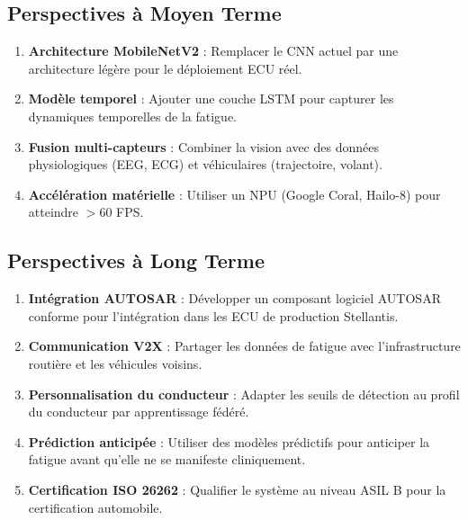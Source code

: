 \subsection{Perspectives à Moyen Terme}

\begin{enumerate}[leftmargin=2cm]
    \item \textbf{Architecture MobileNetV2} : Remplacer le CNN actuel par une architecture légère pour le déploiement ECU réel.
    \item \textbf{Modèle temporel} : Ajouter une couche LSTM pour capturer les dynamiques temporelles de la fatigue.
    \item \textbf{Fusion multi-capteurs} : Combiner la vision avec des données physiologiques (EEG, ECG) et véhiculaires (trajectoire, volant).
    \item \textbf{Accélération matérielle} : Utiliser un NPU (Google Coral, Hailo-8) pour atteindre $> 60$ FPS.
\end{enumerate}

\subsection{Perspectives à Long Terme}

\begin{enumerate}[leftmargin=2cm]
    \item \textbf{Intégration AUTOSAR} : Développer un composant logiciel AUTOSAR conforme pour l'intégration dans les ECU de production Stellantis.
    \item \textbf{Communication V2X} : Partager les données de fatigue avec l'infrastructure routière et les véhicules voisins.
    \item \textbf{Personnalisation du conducteur} : Adapter les seuils de détection au profil du conducteur par apprentissage fédéré.
    \item \textbf{Prédiction anticipée} : Utiliser des modèles prédictifs pour anticiper la fatigue avant qu'elle ne se manifeste cliniquement.
    \item \textbf{Certification ISO 26262} : Qualifier le système au niveau ASIL B pour la certification automobile.
\end{enumerate}

\vspace{1cm}

\begin{center}
\end{center}
